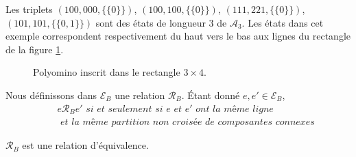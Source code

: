 \begin{Ex}\label{exd1} 
Les triplets $(100,000,\{\{0\}\})$, $(100,100,\{\{0\}\})$, $(111,221,\{\{0\}\})$, $(101,101,\{\{0,1\}\})$ sont des états de longueur $3$ de $\mathcal{A}_{3}$. Les états dans cet exemple correspondent respectivement du haut vers le bas aux lignes du rectangle de la  figure \ref{figetatex}.
\begin{figure}[!htb]
\begin{minipage}[c]{.16\linewidth}
        \centering
\end{minipage}
\hfill
\begin{minipage}[c]{.66\linewidth}
        \centering
\begin{logicpuzzle}[rows=4,columns=3,color=cyan!100, width=750px,scale=0.5]
\framepuzzle[black!50]
\end{logicpuzzle}
\end{minipage}
\caption{\label{figetatex} Polyomino inscrit dans le rectangle  $3\times 4$.}
\end{figure} 
\end{Ex}
Nous définissons dans $\mathcal{E}_{B}$ une relation $\mathcal{R}_{B}$. Étant donné $e, e'\in \mathcal{E}_{B}$, 
\begin{eqnarray}\label{rel}
& & e \mathcal{R}_{B} e' \textit{ si et seulement si } e \textit{ et } e' \textit{  ont la même ligne}\\ \nonumber
& &\textit{ et la même partition non croisée de composantes connexes}
\end{eqnarray}
\begin{Prop}\label{prop20}
$\mathcal{R}_{B}$ est une relation d'équivalence.
\end{Prop}
